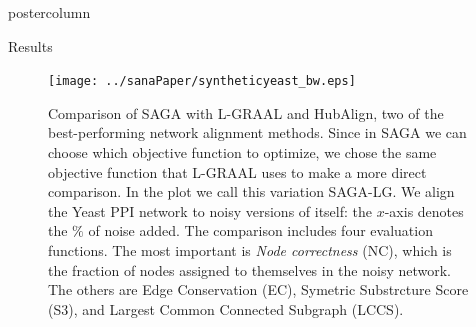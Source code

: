 \documentclass[final,hyperref={pdfpagelabels=false}]{beamer}
\begin{document}
\begin{frame}
\begin{columns}
\begin{column}{.49\textwidth}
\begin{beamercolorbox}[center,wd=\textwidth]{postercolumn}
\begin{minipage}[T]{.95\textwidth}
{\begin{block}{Results}
\begin{figure}
\centering
\texttt{[image: ../sanaPaper/syntheticyeast\_bw.eps]}
\caption{Comparison of SAGA with L-GRAAL and HubAlign, two of the best-performing network alignment methods. Since in SAGA we can choose which objective function to optimize, we chose the same objective function that L-GRAAL uses to make a more direct comparison. In the plot we call this variation SAGA-LG. We align the Yeast PPI network to noisy versions of itself: the $x$-axis denotes the $\%$ of noise added. The comparison includes four evaluation functions. The most important is \textit{Node correctness} (NC), which is the fraction of nodes assigned to themselves in the noisy network. The others are Edge Conservation (EC), Symetric Substrcture Score (S3), and Largest Common Connected Subgraph (LCCS).}
\label{fig:syntheticyeastresults}
\end{figure}                

            \end{block}
%
%
%
          }
        \end{minipage}
      \end{beamercolorbox}
    \end{column}
  \end{columns}
\end{frame}
\end{document}
